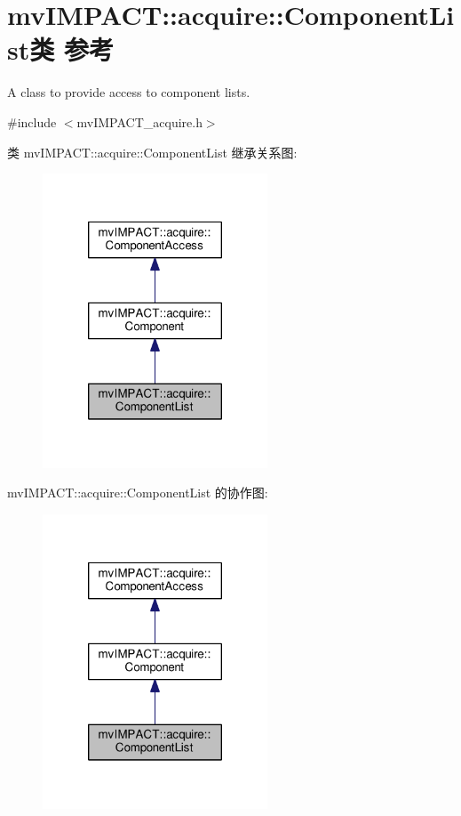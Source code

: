 \hypertarget{classmv_i_m_p_a_c_t_1_1acquire_1_1_component_list}{\section{mv\+I\+M\+P\+A\+C\+T\+:\+:acquire\+:\+:Component\+List类 参考}
\label{classmv_i_m_p_a_c_t_1_1acquire_1_1_component_list}
}


A class to provide access to component lists.  




{\ttfamily \#include $<$mv\+I\+M\+P\+A\+C\+T\+\_\+acquire.\+h$>$}



类 mv\+I\+M\+P\+A\+C\+T\+:\+:acquire\+:\+:Component\+List 继承关系图\+:
\nopagebreak
\begin{figure}[H]
\begin{center}
\leavevmode
\includegraphics[width=190pt]{classmv_i_m_p_a_c_t_1_1acquire_1_1_component_list__inherit__graph}
\end{center}
\end{figure}


mv\+I\+M\+P\+A\+C\+T\+:\+:acquire\+:\+:Component\+List 的协作图\+:
\nopagebreak
\begin{figure}[H]
\begin{center}
\leavevmode
\includegraphics[width=190pt]{classmv_i_m_p_a_c_t_1_1acquire_1_1_component_list__coll__graph}
\end{center}
\end{figure}
